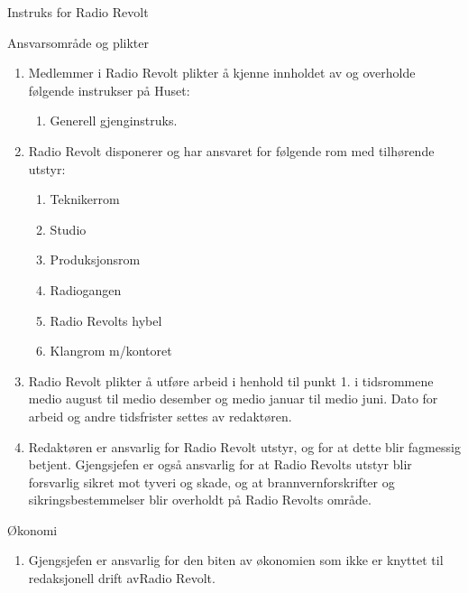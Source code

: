 \documentclass[../fsbok.tex]{subfiles}
\begin{document}
\begin{instruks*}{Instruks for Radio Revolt}
    
    \begin{instruksledd}{Ansvarsområde og plikter}
        \begin{enumerate}   
            \item  Medlemmer i Radio Revolt plikter å kjenne innholdet av og overholde følgende
                instrukser på Huset:
                \begin{enumerate}
                    \item Generell gjenginstruks.
                \end{enumerate}
            \item Radio Revolt disponerer og har ansvaret for følgende rom med tilhørende utstyr:
                \begin{enumerate}
                    \item Teknikerrom
                    \item Studio
                    \item Produksjonsrom
                    \item Radiogangen
                    \item Radio Revolts hybel
                    \item Klangrom m/kontoret
                \end{enumerate}
            \item Radio Revolt plikter å utføre arbeid i henhold til punkt 1. i tidsrommene
                medio august til medio desember og medio januar til medio juni. Dato for arbeid og andre tidsfrister
                settes av redaktøren.
            \item Redaktøren er ansvarlig for Radio Revolt utstyr, og for at dette blir fagmessig
                betjent. Gjengsjefen er også ansvarlig for at Radio Revolts utstyr blir forsvarlig sikret mot tyveri
                og skade, og at brannvernforskrifter og sikringsbestemmelser blir overholdt på Radio Revolts område.
        \end{enumerate}
    \end{instruksledd}


    \begin{instruksledd}{Økonomi}
        \begin{enumerate}
            \item Gjengsjefen er ansvarlig for den biten av økonomien som ikke er knyttet til
                redaksjonell drift avRadio Revolt.
        \end{enumerate}
    \end{instruksledd}
    

\end{instruks*}
\end{document}

